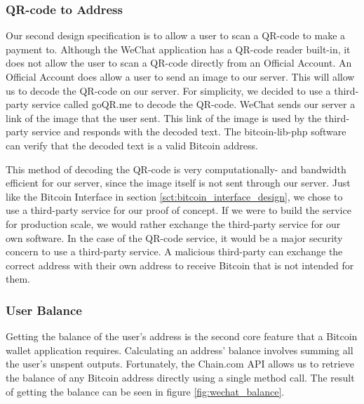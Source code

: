 \subsubsection{QR-code to Address}
Our second design specification is to allow a user to scan a QR-code to make a payment to. Although the WeChat application has a QR-code reader built-in, it does not allow the user to scan a QR-code directly from an Official Account. An Official Account does allow a user to send an image to our server. This will allow us to decode the QR-code on our server. For simplicity, we decided to use a third-party service called goQR.me to decode the QR-code. WeChat sends our server a link of the image that the user sent. This link of the image is used by the third-party service and responds with the decoded text. The bitcoin-lib-php software can verify that the decoded text is a valid Bitcoin address.

This method of decoding the QR-code is very computationally- and bandwidth efficient for our server, since the image itself is not sent through our server. Just like the Bitcoin Interface in section \ref{sct:bitcoin_interface_design}, we chose to use a third-party service for our proof of concept. If we were to build the service for production scale, we would rather exchange the third-party service for our own software. In the case of the QR-code service, it would be a major security concern to use a third-party service. A malicious third-party can exchange the correct address with their own address to receive Bitcoin that is not intended for them.



\subsubsection{User Balance}

Getting the balance of the user's address is the second core feature that a Bitcoin wallet application requires. Calculating an address' balance involves summing all the user's unspent outputs. Fortunately, the Chain.com API allows us to retrieve the balance of any Bitcoin address directly using a single method call. The result of getting the balance can be seen in figure \ref{fig:wechat_balance}.

